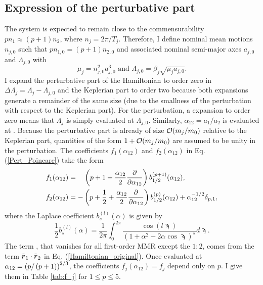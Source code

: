 \documentclass[12pt,a4paper,oneside]{article}
\begin{document}
\subsection{Expression of the perturbative part}
The system is expected to remain close to the commensurability $pn_1\approx\left(p+1\right)n_2$, where $n_j=2\pi/T_j$. Therefore, I define nominal mean motions $n_{j,0}$ such that $p n_{1,0}=\left(p+1\right)n_{2,0}$ and associated nominal semi-major axes $a_{j,0}$ and $\Lambda_{j,0}$ with
\begin{equation}
	\mu_j=n_{j,0}^2a_{j,0}^3\text{ and }\Lambda_{j,0}=\beta_j\sqrt{\mu_ja_{j,0}}.
\end{equation}
I expand the perturbative part of the Hamiltonian to order zero in $\Delta\Lambda_j=\Lambda_j-\Lambda_{j,0}$ and the Keplerian part to order two because both expansions generate a remainder of the same size (due to the smallness of the perturbation with respect to the Keplerian part). For the perturbation, a expansion to order zero means that $\Lambda_j$ is simply evaluated at $\Lambda_{j,0}$. Similarly, $\alpha_{12}=a_1/a_2$ is evaluated at . Because the perturbative part is already of size $\mathcal{O}(m_j/m_0)$ relative to the Keplerian part, quantities of the form $1+\mathcal{O}(m_j/m_0)$ are assumed to be unity in the perturbation. The coefficients $f_1(\alpha_{12})$ and $f_2(\alpha_{12})$ in Eq. (\ref{Pert_Poincare}) take the form \citep[\textit{e.g.}][]{Petit2021}
\begin{equation}
	\begin{split}
		&f_1(\alpha_{12})=\;\;\;\,\left(p+1+\frac{\alpha_{12}}{2}\frac{\partial}{\partial\alpha_{12}}\right)b_{1/2}^{\left(p+1\right)}(\alpha_{12}),\\
		&f_2(\alpha_{12})=-\left(p+\frac{1}{2}+\frac{\alpha_{12}}{2}\frac{\partial}{\partial\alpha_{12}}\right)b_{1/2}^{\left(p\right)}(\alpha_{12})+\alpha_{12}^{-1/2}\delta_{p,1},
	\end{split}
\end{equation}
where the Laplace coefficient $b_s^{(l)}(\alpha)$ is given by \citep{BrouwerClemence1961}
\begin{equation}
	\frac{1}{2}b_s^{(l)}(\alpha)=\frac{1}{2\pi}\int_{0}^{2\pi}\frac{\cos(l\sampi)}{\left(1+\alpha^2-2\alpha\cos\sampi\right)^s}d\sampi.
\end{equation}
The term , that vanishes for all first-order MMR except the $1:2$, comes from the term $\tilde{\mathbf{\boldsymbol{r}}}_1\cdot\tilde{\mathbf{\boldsymbol{r}}}_2$ in Eq. (\ref{Hamiltonian_original}). Once evaluated at $\alpha_{12}=\left(p/\left(p+1\right)\right)^{2/3}$, the coefficients $f_j(\alpha_{12})=f_j$ depend only on $p$. I give them in Table \ref{tab:f_j} for $1\leq p\leq5$.
\end{document}

